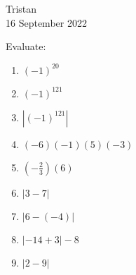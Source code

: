 \documentclass[14pt]{extarticle} %
\begin{document}
\hfill Tristan\\
\null\hfill 16 September 2022

\vspace{10mm}

Evaluate:
\begin{enumerate}[label=\Alph*.), itemsep=\fill]
\item  $(-1)^{20}$
\item  $(-1)^{121}$
\item  $|(-1)^{121}|$
\item  $(-6)(-1)(5)(-3)$
\item  $(-\frac{2}{3})(6)$
\vfill\clearpage
\item $|3-7|$
\item $|6-(-4)|$
\item $|-14+3|-8$
\item $|2-9|$
\vfill\end{enumerate}
\end{document}
